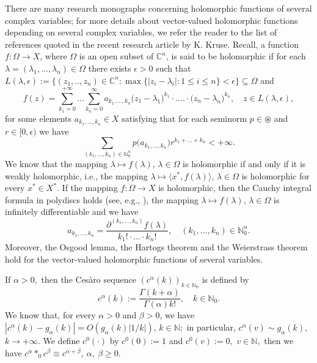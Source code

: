 \documentclass{amsart}
\theoremstyle{definition}
\theoremstyle{remark}
\numberwithin{equation}{section}
\begin{document}
 There are many research monographs concerning holomorphic functions of several complex variables; for more details about vector-valued holomorphic functions depending on several complex variables, we refer the reader to the list of references quoted in the recent research article \cite{kruse} by K. Kruse. Recall, a function $f\colon\Omega\to X$, where $\Omega$ is an open subset of ${\mathbb C}^{n}$, is said to be holomorphic if for each $\lambda=(\lambda_{1},...,\lambda_{n}) \in \Omega$ there exists $\epsilon>0$ such that $L(\lambda,\epsilon):=\{(z_{1},..,z_{n})\in {\mathbb C}^{n} : \max\{ |z_{i}-\lambda_{i}| : 1\leq i\leq n\}<\epsilon \}\subseteq \Omega$  
and
$$
f(z)=\sum_{k_{1}=0}^{+\infty}...\sum_{k_{n}=0}^{\infty}a_{k_{1},...,k_{n}}\bigl( z_{1}-\lambda_{1} \bigr)^{k_{1}}\cdot .... \cdot \bigl( z_{n}-\lambda_{n} \bigr)^{k_{n}},\quad z\in L(\lambda,\epsilon),
$$
for some elements $a_{k_{1},...,k_{n}}\in X$ satisfying that for each seminorm $p\in \circledast$ and $r\in [0,\epsilon)$ we have
$$
\sum_{(k_{1},...,k_{n})\in {\mathbb N}_{0}^{n}}p\bigl(a_{k_{1},...,k_{n}} \bigr) r^{k_{1}+...+k_{n}}<+\infty .
$$ 
We know that the mapping $\lambda\mapsto f(\lambda)$, $\lambda\in\Omega$ is holomorphic if and only if it is weakly holomorphic, i.e., the mapping $\lambda\mapsto\langle x^*,f(\lambda)\rangle$, $\lambda\in\Omega$ is holomorphic for every $x^*\in X^*$.
If the mapping $f\colon\Omega\to X$ is holomorphic, then the Cauchy integral formula in polydiscs holds (see, e.g., \cite[Theorem 5.1, Theorem 5.7]{kruse}), the mapping $\lambda\mapsto f(\lambda)$, $\lambda\in\Omega$ is infinitely differentiable and we have
$$
a_{k_{1},...,k_{n}}=\frac{\partial^{(k_{1},...,k_{n})}f(\lambda)}{k_{1}!\cdot ... \cdot k_{n}!},\quad (k_{1},...,k_{n})\in {\mathbb N}_{0}^{n}.
$$  
Moreover, the Osgood lemma, the Hartogs theorem and the Weierstrass theorem hold for the vector-valued holomorphic functions of several variables.\vspace{0.1cm}

 If $\alpha >0,$ then the Ces\`aro sequence $
(c^{\alpha}(k))_{k\in {\mathbb N}_{0}}$ is defined by
$$
c^{\alpha}(k):=\frac{\Gamma(k+\alpha)}{\Gamma(\alpha)k!},\quad k\in {\mathbb N}_{0}.
$$
We know that, for every $\alpha>0$ and $\beta>0$, we have $| c^{\alpha}(k)-g_{\alpha}(k)|=O(g_{\alpha}(k)|1/k|)$, $k\in {\mathbb N};$ in particular, $ c^{\alpha}(v)\sim g_{\alpha}(k),$ $k\rightarrow +\infty.$ We define $c^{0}(\cdot)$ by $c^{0}(0):=1$ and $c^{0}(v):=0,$ $v\in {\mathbb N},$ then we have
$
c^{\alpha}\ast_{0}c^{\beta}\equiv c^{\alpha+\beta},\ \alpha,\ \beta\geq 0.
$
\end{document}
